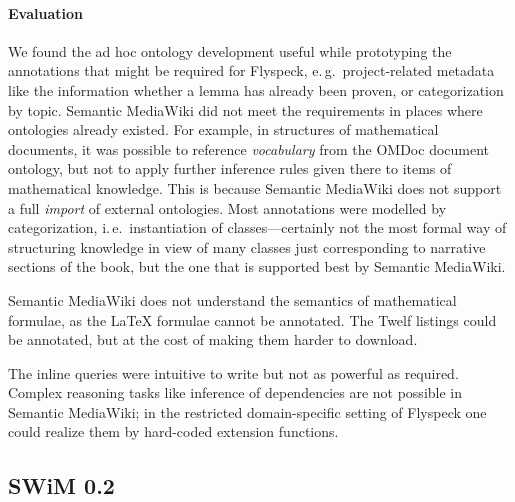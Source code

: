 \paragraph{Evaluation} We found the ad hoc ontology development useful while
prototyping the annotations that might be required for Flyspeck, e.\,g.\
project-related metadata like the information whether a lemma has already been
proven, or categorization by topic.  Semantic MediaWiki did not meet the
requirements in places where ontologies already existed.  For example, in
structures of mathematical documents, it was possible to reference
\emph{vocabulary} from the OMDoc document ontology, but not to apply further
inference rules given there to items of mathematical knowledge.  This is because
Semantic MediaWiki does not support a full \emph{import} of external ontologies.
Most annotations were modelled by categorization, i.\,e.\ instantiation of
classes---certainly not the most formal way of structuring knowledge in view of
many classes just corresponding to narrative sections of the book, but the one
that is supported best by Semantic MediaWiki.

Semantic MediaWiki does not understand the semantics of mathematical formulae,
as the {\LaTeX} formulae cannot be annotated.  The Twelf listings could be
annotated, but at the cost of making them harder to download.

The inline queries were intuitive to write but not as powerful as required.
Complex reasoning tasks like inference of dependencies are not possible in
Semantic MediaWiki; in the restricted domain-specific setting of Flyspeck one
could realize them by hard-coded extension functions.

\subsection{SWiM 0.2}
\label{sec:swim}

